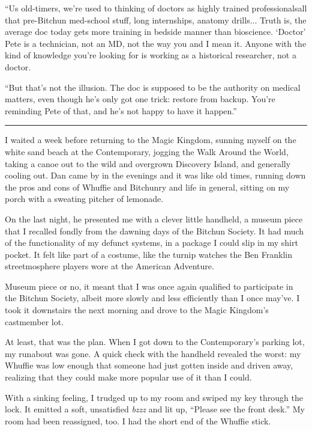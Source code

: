 “Us old-timers, we're used to thinking of doctors as highly trained
professionals{\dash}all that pre-Bitchun med-school stuff, long
internships, anatomy drills... Truth is, the average doc today gets
more training in bedside manner than bioscience. ‘Doctor’ Pete is a
technician, not an MD, not the way you and I mean it. Anyone with
the kind of knowledge you're looking for is working as a historical
researcher, not a doctor.

“But that's not the illusion. The doc is supposed to be the
authority on medical matters, even though he's only got one trick:
restore from backup. You're reminding Pete of that, and he's not
happy to have it happen.”

\begin{center}\rule{3in}{0.4pt}\end{center}

I waited a week before returning to the Magic Kingdom, sunning
myself on the white sand beach at the Contemporary, jogging the
Walk Around the World, taking a canoe out to the wild and overgrown
Discovery Island, and generally cooling out. Dan came by in the
evenings and it was like old times, running down the pros and cons
of Whuffie and Bitchunry and life in general, sitting on my porch
with a sweating pitcher of lemonade.

On the last night, he presented me with a clever little handheld, a
museum piece that I recalled fondly from the dawning days of the
Bitchun Society. It had much of the functionality of my defunct
systems, in a package I could slip in my shirt pocket. It felt like
part of a costume, like the turnip watches the Ben Franklin
streetmosphere players wore at the American Adventure.

Museum piece or no, it meant that I was once again qualified to
participate in the Bitchun Society, albeit more slowly and less
efficiently than I once may've. I took it downstairs the next
morning and drove to the Magic Kingdom's castmember lot.

At least, that was the plan. When I got down to the Contemporary's
parking lot, my runabout was gone. A quick check with the handheld
revealed the worst: my Whuffie was low enough that someone had just
gotten inside and driven away, realizing that they could make more
popular use of it than I could.

With a sinking feeling, I trudged up to my room and swiped my key
through the lock. It emitted a soft, unsatisfied \emph{bzzz} and
lit up, “Please see the front desk.” My room had been reassigned,
too. I had the short end of the Whuffie stick.

